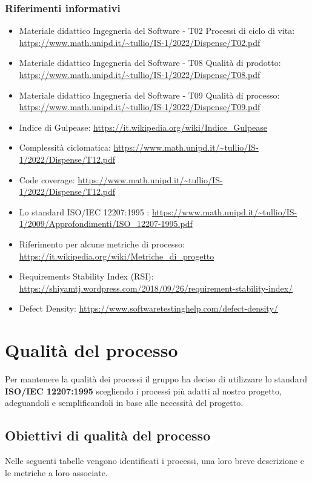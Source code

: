 \subsubsection{Riferimenti informativi}
\begin{itemize}
	\item Materiale didattico Ingegneria del Software - T02 Processi di ciclo di vita: \url{https://www.math.unipd.it/~tullio/IS-1/2022/Dispense/T02.pdf}
	\item Materiale didattico Ingegneria del Software - T08 Qualità di prodotto: \url{https://www.math.unipd.it/~tullio/IS-1/2022/Dispense/T08.pdf}
	\item Materiale didattico Ingegneria del Software - T09 Qualità di processo: \url{https://www.math.unipd.it/~tullio/IS-1/2022/Dispense/T09.pdf}
	\item Indice di Gulpease: \url{https://it.wikipedia.org/wiki/Indice_Gulpease}
	\item Complessità ciclomatica: \url{https://www.math.unipd.it/~tullio/IS-1/2022/Dispense/T12.pdf}
	\item Code coverage: \url{https://www.math.unipd.it/~tullio/IS-1/2022/Dispense/T12.pdf}	
	\item Lo standard ISO/IEC 12207:1995 : \url{https://www.math.unipd.it/~tullio/IS-1/2009/Approfondimenti/ISO_12207-1995.pdf}
	\item Riferimento per alcune metriche di processo: \url{https://it.wikipedia.org/wiki/Metriche_di_progetto}
	\item Requirements Stability Index (RSI): \\ \url{https://shiyamtj.wordpress.com/2018/09/26/requirement-stability-index/}
	\item Defect Density: \url{https://www.softwaretestinghelp.com/defect-density/}
\end{itemize}

\section{Qualità del processo}
Per mantenere la qualità dei processi il gruppo ha deciso di utilizzare lo standard \textbf{ISO/IEC 12207:1995} scegliendo i processi più adatti al nostro progetto, adeguandoli e semplificandoli in base alle necessità del progetto.

\subsection{Obiettivi di qualità del processo}
Nelle seguenti tabelle vengono identificati i processi, una loro breve descrizione e le metriche a loro associate. 
